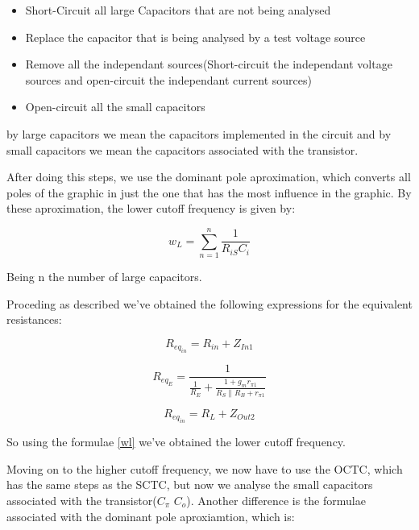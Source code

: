 \begin{itemize}

\item Short-Circuit all large Capacitors that are not being analysed 
\item Replace the capacitor that is being analysed by a test voltage source
\item Remove all the independant sources(Short-circuit the independant voltage sources and open-circuit the independant current sources) 
\item Open-circuit all the small capacitors

\end{itemize}

by large capacitors we mean the capacitors implemented in the circuit and by small capacitors we mean the capacitors associated with the transistor.

After doing this steps, we use the dominant pole aproximation, which converts all poles of the graphic in just the one that has the most influence in the graphic. By these aproximation, the lower cutoff frequency is given by:

\begin{equation}
w_L = \sum_{n = 1}^n \frac{1}{R_{iS}C_i}
\label{wl}
\end{equation} 

Being n the number of large capacitors.

Proceding as described we've obtained the following expressions for the equivalent resistances:

\begin{equation}
R_{eq_{in}} = R_{in} + Z_{In1}
\end{equation} 

\begin{equation}
R_{eq_{E}} = \frac{1}{\frac{1}{R_E}+\frac{1+g_mr_{\pi 1}}{R_S \parallel R_B + r_{\pi 1}}}
\end{equation} 

\begin{equation}
R_{eq_{in}} = R_{L} + Z_{Out2}
\end{equation} 

So using the formulae \ref{wl} we've obtained the lower cutoff frequency.

Moving on to the higher cutoff frequency, we now have to use the OCTC, which has the same steps as the SCTC, but now we analyse the small capacitors associated with the transistor($C_{\pi}$ $C_{o}$). Another difference is the formulae associated with the dominant pole aproxiamtion, which is:

